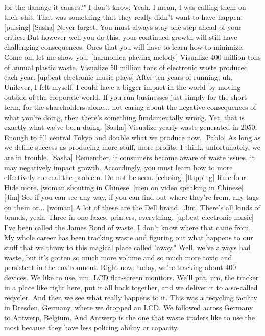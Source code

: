 \documentclass[a4paper]{article}
\begin{document}
	for the damage it causes?"
	I don't know.
	Yeah, I mean, I was calling them on their shit.
	That was something that they really didn't want to have happen.
	[pulsing]
	[Sasha] Never forget.
	You must always stay one step ahead of your critics.
	But however well you do this, your continued growth
	will still have challenging consequences.
	Ones that you will have to learn how to minimize.
	Come on, let me show you.
	[harmonica playing melody]
	Visualize 400 million tons of annual plastic waste.
	Visualize 50 million tons of electronic waste produced each year.
	[upbeat electronic music plays]
	After ten years of running, uh, Unilever,
	I felt myself, I could have a bigger impact in the world
	by moving outside of the corporate world.
	If you run businesses just simply for the short term,
	for the shareholders alone...
	not caring about the negative consequences of what you're doing,
	then there's something fundamentally wrong.
	Yet, that is exactly what we've been doing.
	[Sasha] Visualize yearly waste generated in 2050.
	Enough to fill central Tokyo and double what we produce now.
	[Pablo] As long as we define success as producing more stuff,
	more profits, I think, unfortunately,
	we are in trouble.
	[Sasha] Remember, if consumers become aware of waste issues,
	it may negatively impact growth.
	Accordingly, you must learn how to more effectively conceal the problem.
	Do not be seen. [echoing]
	[flapping]
	Rule four. Hide more.
	[woman shouting in Chinese]
	[men on video speaking in Chinese]
	[Jim] See if you can see any way,
	if you can find out where they're from, any tags on them or...
	[woman] A lot of these are the Dell brand.
	[Jim] There's all kinds of brands, yeah.
	Three-in-one faxes, printers, everything.
	[upbeat electronic music]
	I've been called the James Bond of waste.
	I don't know where that came from.
	My whole career has been tracking waste and figuring out what happens to our stuff
	that we throw to this magical place called "away."
	Well, we've always had waste,
	but it's gotten so much more volume and so much more toxic
	and persistent in the environment.
	Right now, today, we're tracking about 400 devices.
	We like to use, um, LCD flat-screen monitors.
	We'll put, um, the tracker in a place like right here,
	put it all back together,
	and we deliver it to a so-called recycler.
	And then we see what really happens to it.
	This was a recycling facility in Dresden, Germany,
	where we dropped an LCD.
	We followed across Germany to Antwerp, Belgium.
	And Antwerp is the one that waste traders like to use the most
	because they have less policing ability or capacity.
\end{document}
